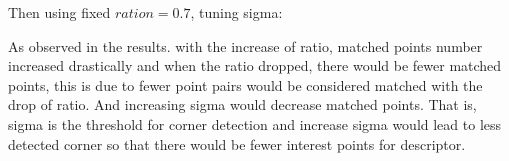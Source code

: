 \documentclass[11pt]{article} \usepackage{fullpage} \usepackage{graphicx} \usepackage{epstopdf} \usepackage{color} \usepackage{psfrag} \usepackage{pdfsync}\usepackage{indentfirst}\usepackage{subfigure}\usepackage{float}\usepackage[section]{placeins}
\begin{document}
Then using fixed $ration = 0.7$, tuning sigma:
\begin{figure}[H]
\centering
{}
\end{figure}

As observed in the results. with the increase of ratio, matched points number increased drastically and when the ratio dropped, there would be fewer matched points, this is due to fewer point pairs would be considered matched with the drop of ratio. And increasing sigma would decrease matched points. That is, sigma is the threshold for corner detection and increase sigma would lead to less detected corner so that there would be fewer interest points for descriptor.
\end{document}
